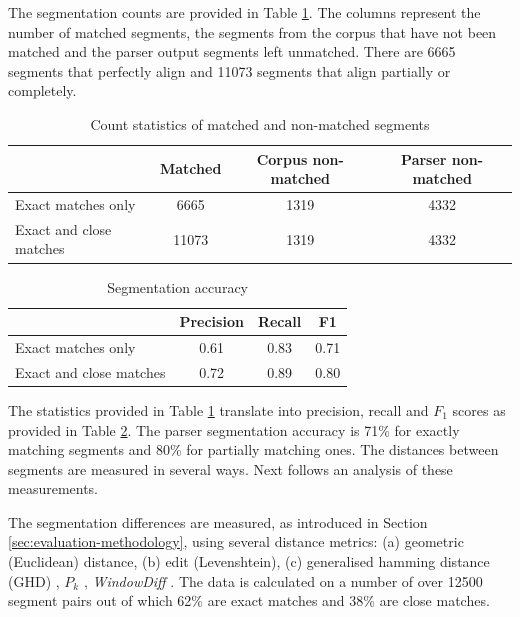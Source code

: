     The segmentation counts are provided in Table \ref{tab:segmentation-stats}. The columns represent  the number of matched segments, the segments from the corpus that have not been matched and the parser output segments left unmatched. There are 6665 segments that perfectly align and 11073 segments that align partially or completely. %
    
    \begin{table}[!ht]
    \centering
    \begin{tabular}{lccc}
    \toprule
    {} &  Matched &  Corpus non-matched &  Parser non-matched \\
    \midrule
    Exact matches only &     6665 &                1319 &                4332 \\
    Exact and close matches &    11073 &                1319 &                4332 \\
    \bottomrule
    \end{tabular}
    \caption{Count statistics of matched and non-matched segments}
    \label{tab:segmentation-stats}
    \end{table}
    
    
    \begin{table}[!ht]
    \centering
    \begin{tabular}{lccc}
    \toprule
    {} &  Precision &  Recall &   F1 \\
    \midrule
    Exact matches only &        0.61 &    0.83 & 0.71 \\
    Exact and close matches                &        0.72 &    0.89 & 0.80 \\
    \bottomrule
    \end{tabular}
    \caption{Segmentation accuracy}
    \label{tab:segmentation-accuracy}
    \end{table}
    
    The statistics provided in Table \ref{tab:segmentation-stats} translate into precision, recall and $F_1$ scores as provided in Table \ref{tab:segmentation-accuracy}. The parser segmentation accuracy is 71\% for exactly matching segments and 80\% for partially matching ones. The distances between segments are measured in several ways. Next follows an analysis of these measurements. 
    
    The segmentation differences are measured, as introduced in Section \ref{sec:evaluation-methodology}, using several distance metrics: (a) geometric (Euclidean) distance, (b) edit (Levenshtein), (c) generalised hamming distance (GHD) \citep{Bookstein2002}, $P_k$ \citep[198--200]{beeferman1999statistical}, \textit{WindowDiff} \citep[10]{pevzner2002critique}. 
    The data is calculated on a number of over 12500 segment pairs out of which 62\% are exact matches and 38\% are close matches. 
    
